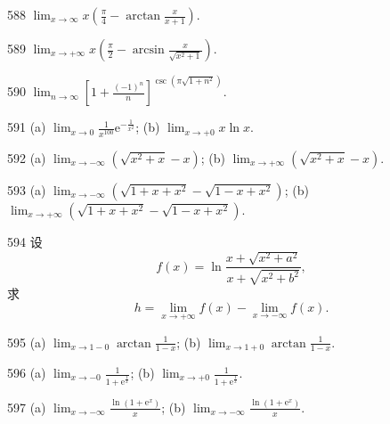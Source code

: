 \begin{prob}[S]{588}
$\displaystyle \lim_{x\to \infty} x\left(\frac{\pi}{4} - \arctan\frac{x}{x+1}\right).$
\end{prob}

\begin{prob}[S]{589}
$\displaystyle \lim_{x\to +\infty} x\left(\frac{\pi}{2} - \arcsin\frac{x}{\sqrt{x^2+1}}\right).$
\end{prob}

\begin{prob}[S]{590}
$\displaystyle \lim_{n\to \infty} \left[1 + \frac{(-1)^n}{n}\right]^{\csc(\pi\sqrt{1+n^2})}.$
\end{prob}

\begin{prob}[M]{591}
(a) $\displaystyle \lim_{x\to 0} \frac{1}{x^{100}}\mathrm{e}^{-\frac{1}{x^2}}$; \qquad (b) $\displaystyle \lim_{x\to +0} x\ln x.$
\end{prob}

\begin{prob}[M]{592}
(a) $\displaystyle \lim_{x\to -\infty} (\sqrt{x^2+x} - x)$; \qquad (b) $\displaystyle \lim_{x\to +\infty} (\sqrt{x^2+x} - x).$
\end{prob}

\begin{prob}[M]{593}
(a) $\displaystyle \lim_{x\to -\infty} (\sqrt{1+x+x^2} - \sqrt{1-x+x^2})$; \qquad (b) $\displaystyle \lim_{x\to +\infty} (\sqrt{1+x+x^2} - \sqrt{1-x+x^2}).$
\end{prob}

\begin{prob}[M]{594}
设
\[
f(x) = \ln\frac{x+\sqrt{x^2+a^2}}{x+\sqrt{x^2+b^2}},
\]
求
\[
h = \lim_{x\to +\infty} f(x) - \lim_{x\to -\infty} f(x).
\]
\end{prob}

\begin{prob}[M]{595}
(a) $\displaystyle \lim_{x\to 1-0} \arctan\frac{1}{1-x}$; \qquad (b) $\displaystyle \lim_{x\to 1+0} \arctan\frac{1}{1-x}.$
\end{prob}

\begin{prob}[M]{596}
(a) $\displaystyle \lim_{x\to -0} \frac{1}{1+\mathrm{e}^{\frac{1}{x}}}$; \qquad (b) $\displaystyle \lim_{x\to +0} \frac{1}{1+\mathrm{e}^{\frac{1}{x}}}.$
\end{prob}

\begin{prob}[M]{597}
(a) $\displaystyle \lim_{x\to -\infty} \frac{\ln(1+\mathrm{e}^x)}{x}$; \qquad (b) $\displaystyle \lim_{x\to -\infty} \frac{\ln(1+\mathrm{e}^x)}{x}.$
\end{prob}

